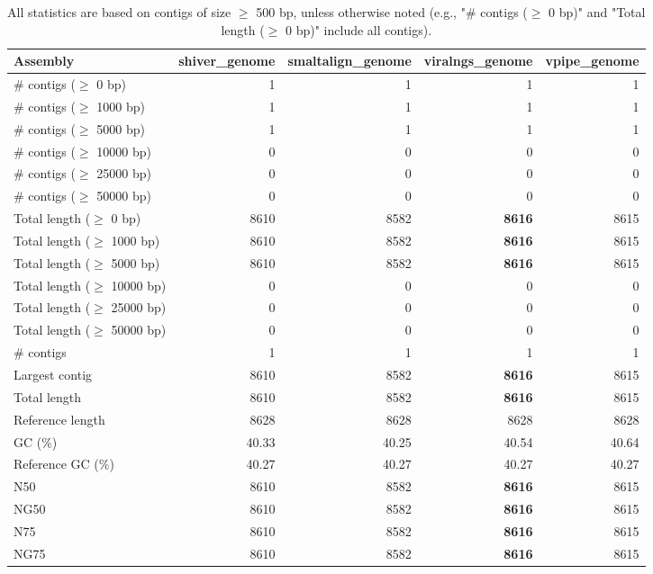 \documentclass[12pt,a4paper]{article}
\begin{document}
\begin{table}[ht]
\begin{center}
\caption{All statistics are based on contigs of size $\geq$ 500 bp, unless otherwise noted (e.g., "\# contigs ($\geq$ 0 bp)" and "Total length ($\geq$ 0 bp)" include all contigs).}
\begin{tabular}{|l*{4}{|r}|}
\hline
Assembly & shiver\_genome & smaltalign\_genome & viralngs\_genome & vpipe\_genome \\ \hline
\# contigs ($\geq$ 0 bp) & 1 & 1 & 1 & 1 \\ \hline
\# contigs ($\geq$ 1000 bp) & 1 & 1 & 1 & 1 \\ \hline
\# contigs ($\geq$ 5000 bp) & 1 & 1 & 1 & 1 \\ \hline
\# contigs ($\geq$ 10000 bp) & 0 & 0 & 0 & 0 \\ \hline
\# contigs ($\geq$ 25000 bp) & 0 & 0 & 0 & 0 \\ \hline
\# contigs ($\geq$ 50000 bp) & 0 & 0 & 0 & 0 \\ \hline
Total length ($\geq$ 0 bp) & 8610 & 8582 & {\bf 8616} & 8615 \\ \hline
Total length ($\geq$ 1000 bp) & 8610 & 8582 & {\bf 8616} & 8615 \\ \hline
Total length ($\geq$ 5000 bp) & 8610 & 8582 & {\bf 8616} & 8615 \\ \hline
Total length ($\geq$ 10000 bp) & 0 & 0 & 0 & 0 \\ \hline
Total length ($\geq$ 25000 bp) & 0 & 0 & 0 & 0 \\ \hline
Total length ($\geq$ 50000 bp) & 0 & 0 & 0 & 0 \\ \hline
\# contigs & 1 & 1 & 1 & 1 \\ \hline
Largest contig & 8610 & 8582 & {\bf 8616} & 8615 \\ \hline
Total length & 8610 & 8582 & {\bf 8616} & 8615 \\ \hline
Reference length & 8628 & 8628 & 8628 & 8628 \\ \hline
GC (\%) & 40.33 & 40.25 & 40.54 & 40.64 \\ \hline
Reference GC (\%) & 40.27 & 40.27 & 40.27 & 40.27 \\ \hline
N50 & 8610 & 8582 & {\bf 8616} & 8615 \\ \hline
NG50 & 8610 & 8582 & {\bf 8616} & 8615 \\ \hline
N75 & 8610 & 8582 & {\bf 8616} & 8615 \\ \hline
NG75 & 8610 & 8582 & {\bf 8616} & 8615 \\ \hline

\end{tabular}
\end{center}
\end{table}
\end{document}
